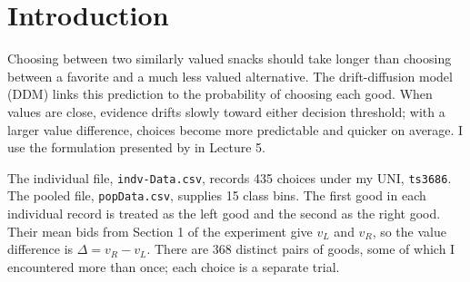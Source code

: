 \section{Introduction}
\label{sec:introduction}

Choosing between two similarly valued snacks should take longer than choosing
between a favorite and a much less valued alternative. The drift-diffusion
model (DDM) links this prediction to the probability of choosing each good.
When values are close, evidence drifts slowly toward either decision threshold;
with a larger value difference, choices become more predictable and quicker on
average. I use the formulation presented by
\textcite[slides 10--11 and 24--26]{woodford2026ddm} in Lecture 5.

The individual file, \texttt{indv-Data.csv}, records 435 choices under my UNI,
\texttt{ts3686}. The pooled file,
\texttt{popData.csv}, supplies 15 class bins.
The first good in each individual record is treated as the left good and the
second as the right good. Their mean bids from Section 1 of the experiment
give $v_L$ and $v_R$, so the value difference is $\Delta=v_R-v_L$.
There are 368 distinct pairs of goods, some of which I encountered more than
once; each choice is a separate trial.
